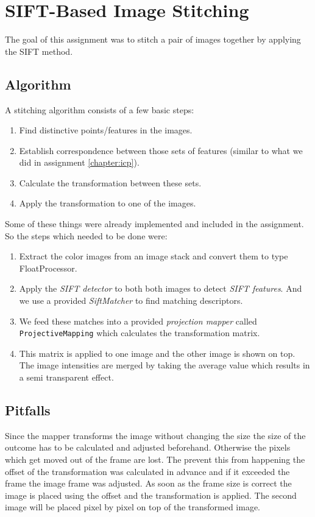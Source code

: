 \chapter{SIFT-Based Image Stitching}
\label{chap:sift}

The goal of this assignment was to stitch a pair of images together by applying the SIFT method. 

\section{Algorithm}
A stitching algorithm consists of a few basic steps:
\begin{enumerate}
	\item Find distinctive points/features in the images.
	\item Establish correspondence between those sets of features (similar to what we did in assignment \ref{chapter:icp}).
	\item Calculate the transformation between these sets.
	\item Apply the transformation to one of the images.
\end{enumerate}

Some of these things were already implemented and included in the assignment. So the steps which needed to be done were:
\begin{enumerate}
	\item Extract the color images from an image stack and convert them to type FloatProcessor.
	\item Apply the \textit{SIFT detector} to both both images to detect \textit{SIFT features}. And we use a provided \textit{SiftMatcher} to find matching descriptors.
	\item We feed these matches into a provided \textit{projection mapper} called \texttt{ProjectiveMapping} which calculates the transformation matrix.
	\item This matrix is applied to one image and the other image is shown on top. The image intensities are merged by taking the average value which results in a semi transparent effect.
\end{enumerate}


\section{Pitfalls}
Since the mapper transforms the image without changing the size the size of the outcome has to be calculated and adjusted beforehand. Otherwise the pixels which get moved out of the frame are lost. The prevent this from happening the offset of the transformation was calculated in advance and if it exceeded the frame the image frame was adjusted. As soon as the frame size is correct the image is placed using the offset and the transformation is applied. The second image will be placed pixel by pixel on top of the transformed image.

